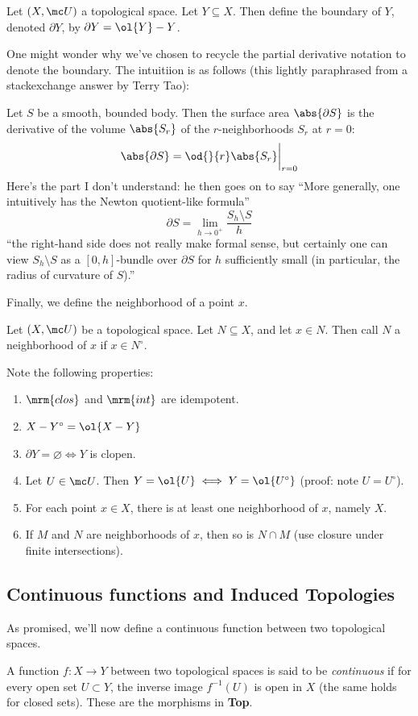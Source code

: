 \documentclass{fkbook}
\theoremstyle{snazzydefinition}
\begin{document}
\begin{adjustwidth}{1em}{1em}
\begin{definition}
    Let $(X, \mc U)$ a topological space. Let $Y \subseteq X$. Then
    define the boundary of $Y$, denoted $\partial Y$, by $\partial Y =
    \ol{Y} - Y$.
  \end{definition}
  One might wonder why we've chosen to recycle the partial derivative
  notation to denote the boundary. The intuitiion is as follows (this
  lightly paraphrased from a stackexchange answer by Terry Tao):
  \begin{leftbar}
    Let $S$ be a smooth, bounded body. Then the surface area
    $\abs{\partial S}$ is the derivative of the volume $\abs{S_r}$ of
    the $r$-neighborhoods $S_r$ at $r = 0$:
    \[
      \abs{\partial S} = \od{}{r} \abs{S_r} \bigg\vert_{r=0}
    \]
    Here's the part I don't understand: he then goes on to say ``More
    generally, one intuitively has the Newton quotient-like formula''
    \[
      \partial S = \lim_{h \to 0^+} \frac{S_h \setminus S}{h}
    \]
    ``the right-hand side does not really make formal sense, but
    certainly one can view $S_h \setminus S$ as a $[0,h]$-bundle over
    $\partial S$ for $h$ sufficiently small (in particular, the radius
    of curvature of $S$).''
  \end{leftbar}
  Finally, we define the neighborhood of a point $x$.
  \begin{definition}[Neighborhood]
    Let $(X, \mc U)$ be a topological space. Let $N \subseteq X$, and
    let $x \in N$. Then call $N$ a neighborhood of $x$ if $x \in
    N^\circ$.
  \end{definition}
  Note the following properties:
  \begin{enumerate}[label=\arabic*.]
    \item $\mrm{clos}$ and $\mrm{int}$ are idempotent.
    \item $X - Y^\circ = \ol{X - Y}$
    \item $\partial Y = \varnothing \iff Y$ is clopen.
    \item Let $U \in \mc U$. Then $Y = \ol{U} \iff Y = \ol{U^\circ}$
      (proof: note $U = U^\circ$).
    \item For each point $x \in X$, there is at least one neighborhood
      of $x$, namely $X$.
    \item If $M$ and $N$ are neighborhoods of $x$, then so is $N \cap
      M$ (use closure under finite intersections).
  \end{enumerate}
  \subsection{Continuous functions and Induced Topologies}
  As promised, we'll now define a continuous function between two
  topological spaces.
  \begin{definition}
    A function $f : X \to Y$ between two topological spaces is said to
    be \emph{continuous} if for every open set $U \subset Y$, the
    inverse image $f^{-1}(U)$ is open in $X$ (the same holds for
    closed sets). These are the morphisms in \textbf{Top}.


\end{definition}
\end{adjustwidth}
\end{document}
